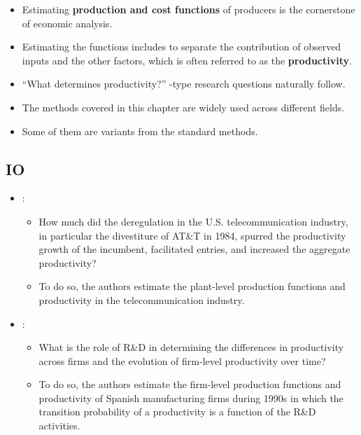 \documentclass[
]{book}
\providecommand{\tightlist}{%
  \setlength{\itemsep}{0pt}\setlength{\parskip}{0pt}}
\begin{document}
\begin{itemize}
\tightlist
\item
  Estimating \textbf{production and cost functions} of producers is the cornerstone of economic analysis.
\item
  Estimating the functions includes to separate the contribution of observed inputs and the other factors, which is often referred to as the \textbf{productivity}.
\item
  ``What determines productivity?'' \citep{Syverson2011}-type research questions naturally follow.
\item
  The methods covered in this chapter are widely used across different fields.
\item
  Some of them are variants from the standard methods.
\end{itemize}

\hypertarget{io}{%
\subsection{IO}\label{io}}

\begin{itemize}
\tightlist
\item
  \citet{Olley1996}:

  \begin{itemize}
  \tightlist
  \item
    How much did the deregulation in the U.S. telecommunication industry, in particular the divestiture of AT\&T in 1984, spurred the productivity growth of the incumbent, facilitated entries, and increased the aggregate productivity?
  \item
    To do so, the authors estimate the plant-level production functions and productivity in the telecommunication industry.
  \end{itemize}
\item
  \citet{Doraszelski2013a}:

  \begin{itemize}
  \tightlist
  \item
    What is the role of R\&D in determining the differences in productivity across firms and the evolution of firm-level productivity over time?
  \item
    To do so, the authors estimate the firm-level production functions and productivity of Spanish manufacturing firms during 1990s in which the transition probability of a productivity is a function of the R\&D activities.
  \end{itemize}
\end{itemize}
\end{document}

